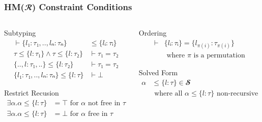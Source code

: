 \documentclass[aspectratio=169]{beamer}
\begin{document}
\endgroup
\begin{frame}[fragile]
  \frametitle{HM($𝓡$) Constraint Conditions}
  \begin{columns}
    \begin{column}{0.5\textwidth}
      \begin{block}{Subtyping}
        \setlength\abovedisplayskip{0pt}
        \begin{align*}
          ⊢ \{l₁ : τ₁, .., lₙ : τₙ\}           & ≤ \{lᵢ : τᵢ\} \\
          τ ≤ \{l : τ₁\} ∧ τ ≤ \{l : τ₂\}      & ⊢ τ₁ = τ₂     \\
          \{.., l : τ₁, ..\} ≤ \{l : τ₂\}      & ⊢ τ₁ = τ₂     \\
          \{l₁ : τ₁, .., lₙ : τₙ\} ≤ \{l : τ\} & ⊢ ⊥
        \end{align*}
      \end{block}
      \begin{block}{Restrict Recusion}
        \setlength\abovedisplayskip{0pt}
        \begin{align*}
          ∃α. α ≤ \{l : τ\} & = ⊤ \text{ for } α \text{ not free in } τ \\
          ∃α. α ≤ \{l : τ\} & = ⊥ \text{ for } α \text{ free in } τ
        \end{align*}
      \end{block}
    \end{column}
    \begin{column}{0.4\textwidth}
      \begin{block}{Ordering}
        \setlength\abovedisplayskip{0pt}
        \begin{align*}
          ⊢ & \{lᵢ : τᵢ\} = \{l_{π(i)} : τ_{π(i)}\}   \\
            & \text{ where } π \text{ is a permutation}
        \end{align*}
      \end{block}
      \begin{block}{Solved Form}
        \setlength\abovedisplayskip{0pt}
        \begin{align*}
          α &≤ \{l : τ\} ∈ 𝓢 \\ 
          & \text{ where all } α ≤ \{l : τ\} \text{ non-recursive}
        \end{align*}
      \end{block}
    \end{column}
  \end{columns}
\end{frame}
\end{document}
